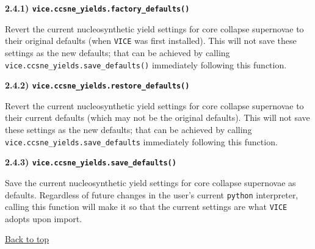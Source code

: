 \documentclass{report}
\begin{document}
\null\par\noindent %
\hypertarget{df:ccsne_yields:factory_defaults}{
	\textbf{2.4.1) \texttt{vice.ccsne\_yields.factory\_defaults()}}
}
\par\noindent
Revert the current nucleosynthetic yield settings for core collapse supernovae 
to their original defaults (when \texttt{VICE} was first installed). This will 
not save these settings as the new defaults; that can be achieved by calling 
\texttt{vice.ccsne\_yields.save\_defaults()} immediately following this 
function. 

\null\par\noindent %
\hypertarget{df:ccsne_yields:restore_defaults}{
	\textbf{2.4.2) \texttt{vice.ccsne\_yields.restore\_defaults()}}
}
\par\noindent
Revert the current nucleosynthetic yield settings for core collapse supernovae 
to their current defaults (which may not be the original defaults). This will 
not save these settings as the new defaults; that can be achieved by calling 
\texttt{vice.ccsne\_yields.save\_defaults} immediately following this 
function. 

\null\par\noindent %
\hypertarget{df:ccsne_yields:save_defaults}{
	\textbf{2.4.3) \texttt{vice.ccsne\_yields.save\_defaults()}}
}
\par\noindent 
Save the current nucleosynthetic yield settings for core collapse supernovae 
as defaults. Regardless of future changes in the user's current \texttt{python} 
interpreter, calling this function will make it so that the current settings 
are what \texttt{VICE} adopts upon import. 

\vfill
\hyperlink{top}{Back to top}
\clearpage 
\end{document}
